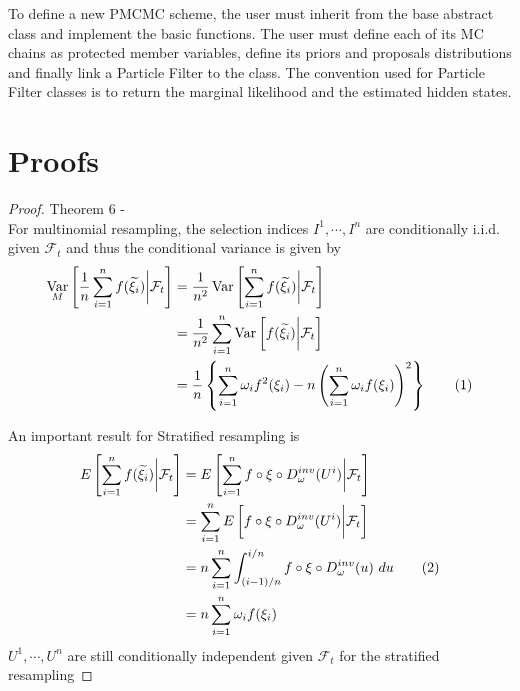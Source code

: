 \documentclass[11pt,a4,twosided,singlespacing,titlepagenumber=on]{scrreprt}
\numberwithin{equation}{chapter} %
\theoremstyle{remark}
\DeclareMathOperator{\var}{Var}
\newcommand\numberthis{\addtocounter{equation}{1}\tag{\theequation}}
\begin{document}
To define a new PMCMC scheme, the user must inherit from the base abstract class and implement the basic functions. The user must define each of its MC chains as protected member variables, define its priors and proposals distributions and finally link a Particle Filter to the class. The convention used for Particle Filter classes is to return the marginal likelihood and the estimated hidden states.

\section{Proofs}
\label{app:proof}
\begin{proof}
Theorem 6 - \cite{douc2005} \\
For multinomial resampling, the selection indices $I^1,\cdots,I^n$ are conditionally i.i.d. given $\mathcal{F}_t$ and thus the conditional variance is given by
\begin{align*}
\var_M \left[ \frac{1}{n} \sum_{i=1}^n f(\widetilde{\xi_i}) \bigg| \mathcal{F}_t \right] &= \frac{1}{n^2} \var \left[ \sum_{i=1}^n f(\widetilde{\xi_i}) \bigg| \mathcal{F}_t \right] \\
																					  &= \frac{1}{n^2} \sum_{i=1}^n \var \left[ f(\widetilde{\xi_i}) \bigg| \mathcal{F}_t \right] \\
																					  &= \frac{1}{n} \left\{\sum_{i=1}^n \omega_i f^2(\xi_i) - n \left(\sum_{i=1}^n \omega_i f(\xi_i)\right)^2\right\} \numberthis
\end{align*}

An important result for Stratified resampling is
\begin{align*}
E \left[ \sum_{i=1}^n f(\widetilde{\xi_i})  \bigg| \mathcal{F}_t \right] &= E \left[ \sum_{i=1}^n f \circ \xi \circ D_\omega^{inv}(U^i) \bigg| \mathcal{F}_t \right] \\
																  &= \sum_{i=1}^n E \left[ f \circ \xi \circ D_\omega^{inv}(U^i) \bigg| \mathcal{F}_t \right] \\
																  &= n \sum_{i=1}^n \int_{(i-1)/n}^{i/n} f \circ \xi \circ D_\omega^{inv}(u)\text{ }du \numberthis \\
																  &= n \sum_{i=1}^n \omega_i f(\xi_i)
\end{align*}
$U^1,\cdots,U^n$ are still conditionally independent given $\mathcal{F}_t$ for the stratified resampling


\end{proof}
\end{document}
